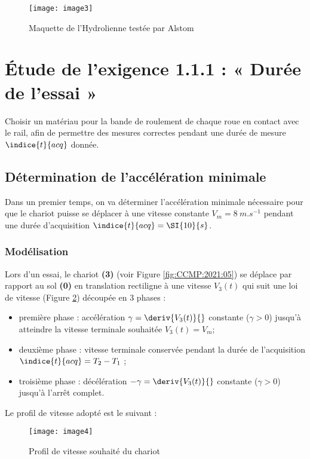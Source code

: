  \begin{figure}[!h]
\centering
\texttt{[image: image3]}
\caption{ \label{fig:CCMP:2021:03} Maquette de l'Hydrolienne testée par Alstom }
\end{figure} 

\section{Étude de l'exigence 1.1.1 : « Durée de l'essai »}
\begin{obj}
Choisir un matériau pour la bande de roulement de chaque roue en contact avec le rail, afin de permettre des mesures correctes pendant une durée de mesure $\indice{t}{acq}$ donnée.
\end{obj}

\subsection{Détermination de l'accélération minimale}
Dans un premier temps, on va déterminer l'accélération minimale nécessaire pour que le chariot puisse se déplacer à une vitesse constante $V_m=\SI{8}{m.s^{-1}}$ pendant une durée d'acquisition $\indice{t}{acq}=\SI{10}{s}$.

\subsubsection*{Modélisation}
Lors d'un essai, le chariot \textbf{(3)} (voir Figure \ref{fig:CCMP:2021:05}) se déplace par rapport au sol \textbf{(0)} en translation rectiligne à une vitesse $V_3 (t)$ qui suit une loi de vitesse (Figure \ref{fig:CCMP:2021:04}) découpée en 3 phases :
\begin{itemize}
	\item première phase :	accélération $\gamma = \deriv{V_3(t)}{}$ constante ($\gamma >0$) jusqu'à atteindre la vitesse terminale souhaitée $V_3 (t)=V_m$;
	\item deuxième phase :	vitesse terminale conservée pendant la durée de l'acquisition $\indice{t}{acq}=T_2-T_1$ ;
	\item troisième phase :	décélération $-\gamma = \deriv{V_3(t)}{}$ constante ($\gamma >0$) jusqu'à l'arrêt complet.
\end{itemize}

Le profil de vitesse adopté est le suivant :
  
\begin{figure}[!h]
\centering
\texttt{[image: image4]}
\caption{ \label{fig:CCMP:2021:04} Profil de vitesse souhaité du chariot}
\end{figure} 

